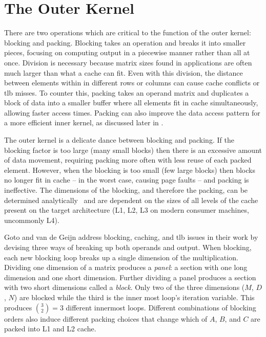 \documentclass[\main/thesis.tex]{subfiles}
\begin{document}
\section{The Outer Kernel}
\label{sec:outerKernel}
There are two operations which are critical to the function of the outer kernel: blocking and packing.
Blocking takes an operation and breaks it into smaller pieces, focusing on computing output in a piecewise manner rather than all at once.
Division is necessary because matrix sizes found in applications are often much larger than what a cache can fit.
Even with this division, the distance between elements within in different rows or columns can cause cache conflicts or \gls{tlb} misses.
To counter this, packing takes an operand matrix and duplicates a block of data into a smaller buffer where all elements fit in cache simultaneously, allowing faster access times.
Packing can also improve the data access pattern for a more efficient inner kernel, as discussed later in .

The outer kernel is a delicate dance between blocking and packing.
If the blocking factor is too large (\ie many small blocks) then there is an excessive amount of data movement, requiring packing more often with less reuse of each packed element.
However, when the blocking is too small (\ie few large blocks) then blocks no longer fit in cache -- in the worst case, causing page faults -- and packing is ineffective.
The dimensions of the blocking, and therefore the packing, can be determined analytically~\autocite{low2016analytical} and are dependent on the sizes of all levels of the cache present on the target architecture (L1, L2, L3 on modern consumer machines, uncommonly L4).

Goto and van de Geijn address blocking, caching, and \gls{tlb} issues in their work by devising three ways of breaking up both operands and output.
When blocking, each new blocking loop breaks up a single dimension of the multiplication.
Dividing one dimension of a matrix produces a \emph{panel}: a section with one long dimension and one short dimension.
Further dividing a panel produces a section with two short dimensions called a \emph{block}.
Only two of the three dimensions ($M$, $D$, $N$) are blocked while the third is the inner most loop's iteration variable.
This produces $\binom{3}{2}=3$ different innermost loops\footnotemark.
Different combinations of blocking orders also induce different packing choices that change which of $A$, $B$, and $C$ are packed into L1 and L2 cache.
\end{document}
